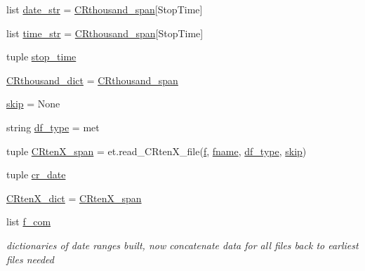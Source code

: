 \begin{DoxyCompactItemize}
\item 
list \hyperlink{namespace_date___ranges___concat_a0ca32bca90b9650a04d4032d34c06410}{date\+\_\+str} = \hyperlink{namespace_date___ranges___concat_ab1f6fe2daf46f0f39aaa5ea22ca94dd4}{C\+Rthousand\+\_\+span}\mbox{[}\textquotesingle{}Stop\+Time\textquotesingle{}\mbox{]}
\item 
list \hyperlink{namespace_date___ranges___concat_a2c27ffe6818fdec6a17cbfbab976f410}{time\+\_\+str} = \hyperlink{namespace_date___ranges___concat_ab1f6fe2daf46f0f39aaa5ea22ca94dd4}{C\+Rthousand\+\_\+span}\mbox{[}\textquotesingle{}Stop\+Time\textquotesingle{}\mbox{]}
\item 
tuple \hyperlink{namespace_date___ranges___concat_a16dab1ca25a0cecb2d7155a0ec870c8b}{stop\+\_\+time}
\item 
\hyperlink{namespace_date___ranges___concat_a527828f48f96289fef64fc5b6f3391ed}{C\+Rthousand\+\_\+dict} = \hyperlink{namespace_date___ranges___concat_ab1f6fe2daf46f0f39aaa5ea22ca94dd4}{C\+Rthousand\+\_\+span}
\item 
\hyperlink{namespace_date___ranges___concat_ac79f5594c22369ee26b36b9bb99a6257}{skip} = None
\item 
string \hyperlink{namespace_date___ranges___concat_a34d743f3f351e0c5fdce2c21586a234d}{df\+\_\+type} = \textquotesingle{}met\textquotesingle{}
\item 
tuple \hyperlink{namespace_date___ranges___concat_aada68102430e27b392077e44cee7ae5b}{C\+Rten\+X\+\_\+span} = et.\+read\+\_\+\+C\+Rten\+X\+\_\+file(\hyperlink{namespace_date___ranges___concat_a21362afa3c3692b51bae83ce0459dcd7}{f}, \hyperlink{namespace_date___ranges___concat_a86701c1e83bc108fd48d569692baf90a}{fname}, \hyperlink{namespace_date___ranges___concat_a34d743f3f351e0c5fdce2c21586a234d}{df\+\_\+type}, \hyperlink{namespace_date___ranges___concat_ac79f5594c22369ee26b36b9bb99a6257}{skip})
\item 
tuple \hyperlink{namespace_date___ranges___concat_a539cd8f2fa606ab4b45a99ebf85cfea5}{cr\+\_\+date}
\item 
\hyperlink{namespace_date___ranges___concat_a52fc1e93f26878cf7dbed683ee91f254}{C\+Rten\+X\+\_\+dict} = \hyperlink{namespace_date___ranges___concat_aada68102430e27b392077e44cee7ae5b}{C\+Rten\+X\+\_\+span}
\item 
list \hyperlink{namespace_date___ranges___concat_afc781be6ba4a2beb6b49dc302a1efd30}{f\+\_\+com}
\begin{DoxyCompactList}\small\item\em dictionaries of date ranges built, now concatenate data for all files back to earliest files needed \end{DoxyCompactList}\item 

\end{DoxyCompactItemize}
